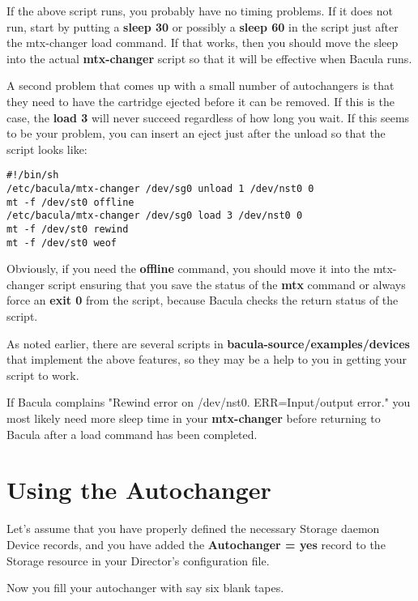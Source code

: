 If the above script runs, you probably have no timing problems. If it does not
run, start by putting a {\bf sleep 30} or possibly a {\bf sleep 60} in the 
script just after the mtx-changer load command. If that works, then you should
move the sleep into the actual {\bf mtx-changer} script so that it will be
effective when Bacula runs. 

A second problem that comes up with a small number of autochangers is that
they need to have the cartridge ejected before it can be removed. If this is
the case, the {\bf load 3} will never succeed regardless of how long you wait.
If this seems to be your problem, you can insert an eject just after the
unload so that the script looks like: 

\footnotesize
\begin{verbatim}
#!/bin/sh
/etc/bacula/mtx-changer /dev/sg0 unload 1 /dev/nst0 0
mt -f /dev/st0 offline
/etc/bacula/mtx-changer /dev/sg0 load 3 /dev/nst0 0
mt -f /dev/st0 rewind
mt -f /dev/st0 weof
\end{verbatim}
\normalsize

Obviously, if you need the {\bf offline} command, you should move it into the
mtx-changer script ensuring that you save the status of the {\bf mtx} command
or always force an {\bf exit 0} from the script, because Bacula checks the
return status of the script. 

As noted earlier, there are several scripts in {\bf
\lt{}bacula-source\gt{}/examples/devices} that implement the above features,
so they may be a help to you in getting your script to work. 

If Bacula complains "Rewind error on /dev/nst0. ERR=Input/output error." you
most likely need more sleep time in your {\bf mtx-changer} before returning to
Bacula after a load command has been completed.

\label{using}

\section{Using the Autochanger}

Let's assume that you have properly defined the necessary Storage daemon
Device records, and you have added the {\bf Autochanger = yes} record to the
Storage resource in your Director's configuration file. 

Now you fill your autochanger with say six blank tapes. 

